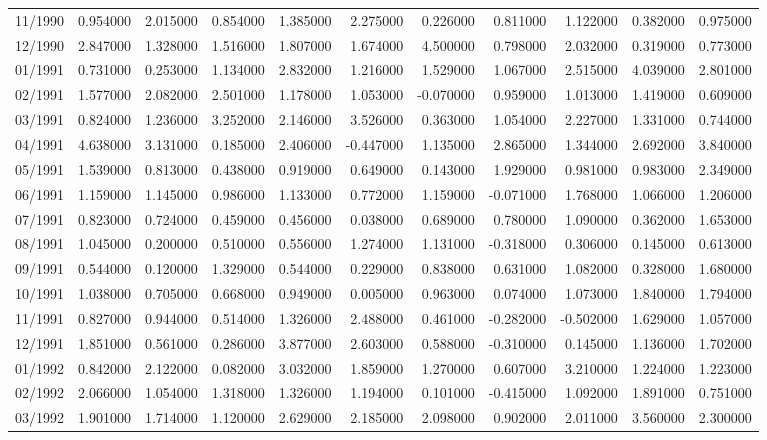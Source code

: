\begin{tabular}{lrrrrrrrrrr}
11/1990 & 0.954000 & 2.015000 & 0.854000 & 1.385000 & 2.275000 & 0.226000 & 0.811000 & 1.122000 & 0.382000 & 0.975000 \\
12/1990 & 2.847000 & 1.328000 & 1.516000 & 1.807000 & 1.674000 & 4.500000 & 0.798000 & 2.032000 & 0.319000 & 0.773000 \\
01/1991 & 0.731000 & 0.253000 & 1.134000 & 2.832000 & 1.216000 & 1.529000 & 1.067000 & 2.515000 & 4.039000 & 2.801000 \\
02/1991 & 1.577000 & 2.082000 & 2.501000 & 1.178000 & 1.053000 & -0.070000 & 0.959000 & 1.013000 & 1.419000 & 0.609000 \\
03/1991 & 0.824000 & 1.236000 & 3.252000 & 2.146000 & 3.526000 & 0.363000 & 1.054000 & 2.227000 & 1.331000 & 0.744000 \\
04/1991 & 4.638000 & 3.131000 & 0.185000 & 2.406000 & -0.447000 & 1.135000 & 2.865000 & 1.344000 & 2.692000 & 3.840000 \\
05/1991 & 1.539000 & 0.813000 & 0.438000 & 0.919000 & 0.649000 & 0.143000 & 1.929000 & 0.981000 & 0.983000 & 2.349000 \\
06/1991 & 1.159000 & 1.145000 & 0.986000 & 1.133000 & 0.772000 & 1.159000 & -0.071000 & 1.768000 & 1.066000 & 1.206000 \\
07/1991 & 0.823000 & 0.724000 & 0.459000 & 0.456000 & 0.038000 & 0.689000 & 0.780000 & 1.090000 & 0.362000 & 1.653000 \\
08/1991 & 1.045000 & 0.200000 & 0.510000 & 0.556000 & 1.274000 & 1.131000 & -0.318000 & 0.306000 & 0.145000 & 0.613000 \\
09/1991 & 0.544000 & 0.120000 & 1.329000 & 0.544000 & 0.229000 & 0.838000 & 0.631000 & 1.082000 & 0.328000 & 1.680000 \\
10/1991 & 1.038000 & 0.705000 & 0.668000 & 0.949000 & 0.005000 & 0.963000 & 0.074000 & 1.073000 & 1.840000 & 1.794000 \\
11/1991 & 0.827000 & 0.944000 & 0.514000 & 1.326000 & 2.488000 & 0.461000 & -0.282000 & -0.502000 & 1.629000 & 1.057000 \\
12/1991 & 1.851000 & 0.561000 & 0.286000 & 3.877000 & 2.603000 & 0.588000 & -0.310000 & 0.145000 & 1.136000 & 1.702000 \\
01/1992 & 0.842000 & 2.122000 & 0.082000 & 3.032000 & 1.859000 & 1.270000 & 0.607000 & 3.210000 & 1.224000 & 1.223000 \\
02/1992 & 2.066000 & 1.054000 & 1.318000 & 1.326000 & 1.194000 & 0.101000 & -0.415000 & 1.092000 & 1.891000 & 0.751000 \\
03/1992 & 1.901000 & 1.714000 & 1.120000 & 2.629000 & 2.185000 & 2.098000 & 0.902000 & 2.011000 & 3.560000 & 2.300000 \\

\end{tabular}
